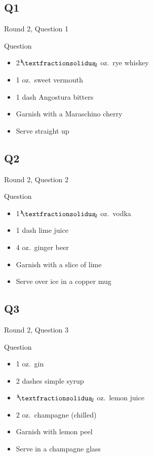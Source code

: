 \documentclass[11pt]{beamer}
\begin{document}
\subsection*{Q1}
\begin{frame}[t]{Round 2, Question 1}
\begin{block}{Question}
\begin{itemize}
\item 2\({}^1{\mskip -5mu⁄\mskip -3mu}_2\) oz.\ rye whiskey
\item 1 oz.\ sweet vermouth
\item 1 dash Angostura bitters
\item Garnish with a Maraschino cherry
\item Serve straight up
\end{itemize}
\end{block}
\end{frame}
\subsection*{Q2}
\begin{frame}[t]{Round 2, Question 2}
\begin{block}{Question}
\begin{itemize}
\item 1\({}^1{\mskip -5mu⁄\mskip -3mu}_2\) oz.\ vodka
\item 1 dash lime juice
\item 4 oz.\ ginger beer
\item Garnish with a slice of lime
\item Serve over ice in a copper mug
\end{itemize}
\end{block}
\end{frame}
\subsection*{Q3}
\begin{frame}[t]{Round 2, Question 3}
\begin{block}{Question}
\begin{itemize}
\item 1 oz.\ gin
\item 2 dashes simple syrup
\item \({}^1{\mskip -5mu⁄\mskip -3mu}_2\) oz.\ lemon juice
\item 2 oz.\ champagne (chilled)
\item Garnish with lemon peel
\item Serve in a champagne glass
\end{itemize}
\end{block}
\end{frame}
\end{document}
